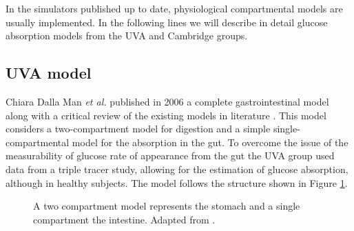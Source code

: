 In the simulators published up to date, physiological compartmental models are usually implemented. In the following lines we will describe in detail glucose absorption models from the UVA and Cambridge groups.

\subsection{UVA model}
\label{sec:ModelBasedOnDallaManEtAl}

Chiara Dalla Man \textit{et al.} published in 2006 a complete gastrointestinal model along with a critical review of the existing models in literature \cite{man2006system}. This model considers a two-compartment model for digestion and a simple single-compartmental model for the absorption in the gut. To overcome the issue of the measurability of glucose rate of appearance from the gut the UVA group used data from a triple tracer study, allowing for the estimation of glucose absorption, although in healthy subjects. The model follows the structure shown in Figure \ref{fig:dallaman}.

\begin{figure}[hbtp]
\centering
{}\caption{A two compartment model represents the stomach and a single compartment the intestine. Adapted from \cite{man2006system}.}
\label{fig:dallaman}
\end{figure}

